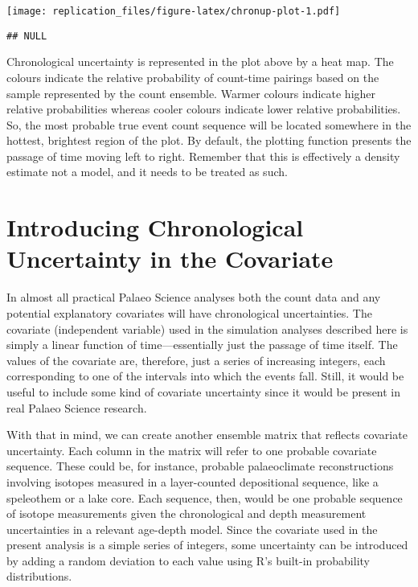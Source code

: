 \documentclass[]{article}
\begin{document}
\texttt{[image: replication\_files/figure-latex/chronup-plot-1.pdf]}

\begin{verbatim}
## NULL
\end{verbatim}

Chronological uncertainty is represented in the plot above by a heat
map. The colours indicate the relative probability of count-time
pairings based on the sample represented by the count ensemble. Warmer
colours indicate higher relative probabilities whereas cooler colours
indicate lower relative probabilities. So, the most probable true event
count sequence will be located somewhere in the hottest, brightest
region of the plot. By default, the plotting function presents the
passage of time moving left to right. Remember that this is effectively
a density estimate not a model, and it needs to be treated as such.

\section{Introducing Chronological Uncertainty in the
Covariate}\label{introducing-chronological-uncertainty-in-the-covariate}

In almost all practical Palaeo Science analyses both the count data and
any potential explanatory covariates will have chronological
uncertainties. The covariate (independent variable) used in the
simulation analyses described here is simply a linear function of
time---essentially just the passage of time itself. The values of the
covariate are, therefore, just a series of increasing integers, each
corresponding to one of the intervals into which the events fall. Still,
it would be useful to include some kind of covariate uncertainty since
it would be present in real Palaeo Science research.

With that in mind, we can create another ensemble matrix that reflects
covariate uncertainty. Each column in the matrix will refer to one
probable covariate sequence. These could be, for instance, probable
palaeoclimate reconstructions involving isotopes measured in a
layer-counted depositional sequence, like a speleothem or a lake core.
Each sequence, then, would be one probable sequence of isotope
measurements given the chronological and depth measurement uncertainties
in a relevant age-depth model. Since the covariate used in the present
analysis is a simple series of integers, some uncertainty can be
introduced by adding a random deviation to each value using R's built-in
probability distributions.
\end{document}
